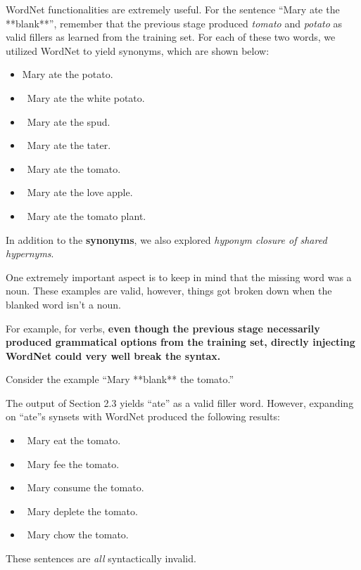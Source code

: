 \documentclass{article}[12pt]
\theoremstyle{definition}
\begin{document}
WordNet functionalities are extremely useful. For the sentence 
``Mary ate the **blank**'', remember that the previous stage produced \emph{tomato} and \emph{potato} as valid fillers as learned from the training set. For each of these two words, we utilized WordNet to yield synonyms, which are shown below:

\begin{itemize}
\item  Mary ate the potato.
\item\ Mary ate the white potato.
\item\ Mary ate the spud.
\item\ Mary ate the tater.
\end{itemize}

\begin{itemize}
\item\ Mary ate the tomato.
\item\ Mary ate the love apple.
\item\ Mary ate the tomato plant.
\end{itemize}

In addition to the \textbf{synonyms}, we also explored \emph{hyponym closure of shared hypernyms}.  

One extremely important aspect is to keep in mind that the missing word was a noun. These examples are valid, however, things got broken down when the blanked word isn't a noun.

For example, for verbs, \textbf{even though the previous stage necessarily produced grammatical options from the training set, directly injecting WordNet could very well break the syntax.}

Consider the example ``Mary **blank** the tomato.''

The output of Section 2.3 yields ``ate'' as a valid filler word. However, expanding on ``ate''s synsets with WordNet produced the following results: 

\begin{itemize}
\item\ Mary eat the tomato.
\item\ Mary fee the tomato.
\item\ Mary consume the tomato.
\item\ Mary deplete the tomato.
\item\ Mary chow the tomato.
\end{itemize}

These sentences are \emph{all} syntactically invalid. 
\end{document}
